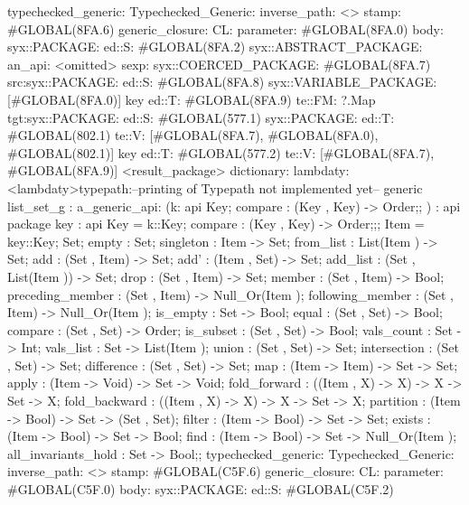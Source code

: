 typechecked_generic:
Typechecked_Generic:
inverse_path: <>
stamp: #GLOBAL(8FA.6)
generic_closure:
CL:
parameter: #GLOBAL(8FA.0)
body: syx::PACKAGE:
        ed::S: #GLOBAL(8FA.2)
            syx::ABSTRACT_PACKAGE:
                an_api: <omitted>
                sexp:
                    syx::COERCED_PACKAGE:
                        #GLOBAL(8FA.7)
                         src:syx::PACKAGE:
                                ed::S: #GLOBAL(8FA.8) syx::VARIABLE_PACKAGE: [#GLOBAL(8FA.0)] key
                                ed::T: #GLOBAL(8FA.9) te::FM: ?.Map
                        tgt:syx::PACKAGE:
                            ed::S: #GLOBAL(577.1)
                             syx::PACKAGE:
                             ed::T: #GLOBAL(802.1) te::V: [#GLOBAL(8FA.7), #GLOBAL(8FA.0), #GLOBAL(802.1)]
                             key
                            ed::T: #GLOBAL(577.2)
                             te::V:
                             [#GLOBAL(8FA.7), #GLOBAL(8FA.9)]
         <result_package>
dictionary:
lambdaty:
  <lambdaty>typepath:--printing of Typepath not implemented yet--
generic list_set_g
:
a_generic_api:
(k:
api {
    Key;
    compare : (Key , Key) -> Order;};
)
:
api {   package key
          : api {
                Key  = k::Key;
                compare : (Key , Key) -> Order;};;
    Item  = key::Key;
    Set;
    empty : Set;
    singleton : Item -> Set;
    from_list : List(Item ) -> Set;
    add : (Set , Item) -> Set;
    add' : (Item , Set) -> Set;
    add_list : (Set , List(Item )) -> Set;
    drop : (Set , Item) -> Set;
    member : (Set , Item) -> Bool;
    preceding_member : (Set , Item) -> Null_Or(Item );
    following_member : (Set , Item) -> Null_Or(Item );
    is_empty : Set -> Bool;
    equal : (Set , Set) -> Bool;
    compare : (Set , Set) -> Order;
    is_subset : (Set , Set) -> Bool;
    vals_count : Set -> Int;
    vals_list : Set -> List(Item );
    union : (Set , Set) -> Set;
    intersection : (Set , Set) -> Set;
    difference : (Set , Set) -> Set;
    map : (Item -> Item) -> Set -> Set;
    apply : (Item -> Void) -> Set -> Void;
    fold_forward : ((Item , X) -> X) -> X -> Set -> X;
    fold_backward : ((Item , X) -> X) -> X -> Set -> X;
    partition : (Item -> Bool) -> Set -> (Set , Set);
    filter : (Item -> Bool) -> Set -> Set;
    exists : (Item -> Bool) -> Set -> Bool;
    find : (Item -> Bool) -> Set -> Null_Or(Item );
    all_invariants_hold : Set -> Bool;};
typechecked_generic:
Typechecked_Generic:
inverse_path: <>
stamp: #GLOBAL(C5F.6)
generic_closure:
CL:
parameter: #GLOBAL(C5F.0)
body: syx::PACKAGE:
        ed::S: #GLOBAL(C5F.2)
